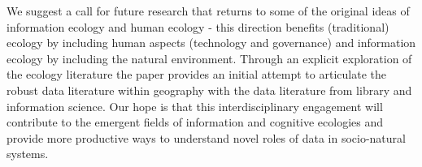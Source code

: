 We suggest a call for future research that returns to some of the original ideas of information ecology and human ecology - this direction benefits (traditional) ecology by including human aspects (technology and governance) and information ecology by including the natural environment. Through an explicit exploration of the ecology literature the paper provides an initial attempt to articulate the robust data literature within geography with the data literature from library and information science. Our hope is that this interdisciplinary engagement will contribute to the emergent fields of information and cognitive ecologies and provide more productive ways to understand novel roles of data in socio-natural systems.